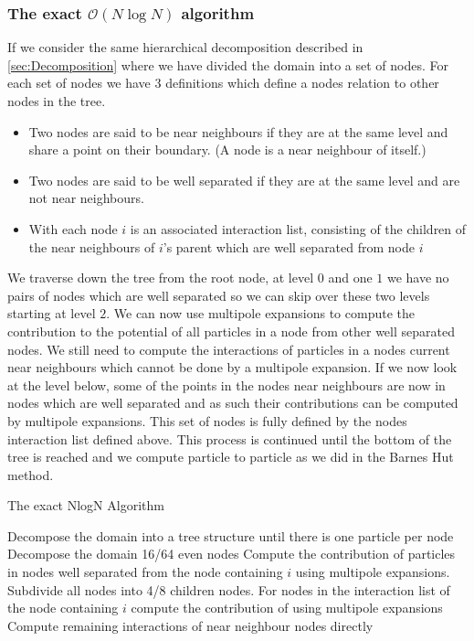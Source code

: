 \subsubsection{\texorpdfstring{The exact $\mathcal{O}(N\log N)$ algorithm}{The exact O(NlogN) algorithm}}
If we consider the same hierarchical decomposition described in \cref{sec:Decomposition} where we have divided the domain into a set of nodes. For each set of nodes we have 3 definitions which define a nodes relation to other nodes in the tree.
\begin{itemize}
    \item Two nodes are said to be near neighbours if they are at the same level and share a point on their boundary. (A node is a near neighbour of itself.)
    \item Two nodes are said to be well separated if they are at the same level and are not near neighbours.
    \item With each node $i$ is an associated interaction list, consisting of the children of the near neighbours of $i$’s parent which are well separated from node $i$
\end{itemize}
We traverse down the tree from the root node, at level $0$ and one $1$ we have no pairs of nodes which are well separated so we can skip over these two levels starting at level $2$. We can now use multipole expansions to compute the contribution to the potential of all particles in a node from other well separated nodes. We still need to compute the interactions of particles in a nodes current near neighbours which cannot be done by a multipole expansion. If we now look at the level below, some of the points in the nodes near neighbours are now in nodes which are well separated and as such their contributions can be computed by multipole expansions. This set of nodes is fully defined by the nodes interaction list defined above. This process is continued until the bottom of the tree is reached and we compute particle to particle as we did in the Barnes Hut method. 

\begin{algorithm}[ht]
\caption{The exact NlogN Algorithm}\label{alg:FMMNlogN}
\begin{algorithmic}
\State Decompose the domain into a tree structure until there is one particle per node
    \State Decompose the domain 16/64 even nodes
    \State Compute the contribution of particles in nodes well separated from the node
    \State \; containing $i$ using multipole expansions.
    \Repeat
        \State Subdivide all nodes into 4/8 children nodes.
        \State For nodes in the interaction list of the node containing $i$ compute the 
        \State \; contribution of using multipole expansions
    \State Compute remaining interactions of near neighbour nodes directly
\EndFor
\end{algorithmic}
\end{algorithm}

